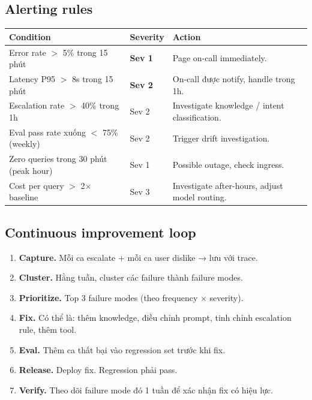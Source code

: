 \documentclass[11pt,a4paper]{article}
\begin{document}
\subsection{Alerting rules}

\begin{tabularx}{\linewidth}{@{}p{4cm} p{2cm} X@{}}
\toprule
\textbf{Condition} & \textbf{Severity} & \textbf{Action} \\
\midrule
Error rate $>$ 5\% trong 15 phút & \textbf{Sev 1} & Page on-call immediately. \\
Latency P95 $>$ 8s trong 15 phút & \textbf{Sev 2} & On-call được notify, handle trong 1h. \\
Escalation rate $>$ 40\% trong 1h & Sev 2 & Investigate knowledge / intent classification. \\
Eval pass rate xuống $<$ 75\% (weekly) & Sev 2 & Trigger drift investigation. \\
Zero queries trong 30 phút (peak hour) & Sev 1 & Possible outage, check ingress. \\
Cost per query $>$ 2$\times$ baseline & Sev 3 & Investigate after-hours, adjust model routing. \\
\bottomrule
\end{tabularx}

\subsection{Continuous improvement loop}

\begin{enumerate}
\item \textbf{Capture.} Mỗi ca escalate + mỗi ca user dislike → lưu với trace.
\item \textbf{Cluster.} Hằng tuần, cluster các failure thành failure modes.
\item \textbf{Prioritize.} Top 3 failure modes (theo frequency × severity).
\item \textbf{Fix.} Có thể là: thêm knowledge, điều chỉnh prompt, tinh chỉnh escalation rule, thêm tool.
\item \textbf{Eval.} Thêm ca thất bại vào regression set trước khi fix.
\item \textbf{Release.} Deploy fix. Regression phải pass.
\item \textbf{Verify.} Theo dõi failure mode đó 1 tuần để xác nhận fix có hiệu lực.
\end{enumerate}

\clearpage

\end{document}
